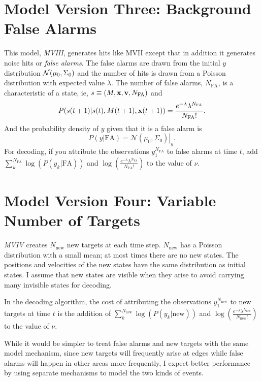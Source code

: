 \documentclass[12pt]{article}
\newcommand{\normal}[2]{{\cal N}(#1,#2)}
\newcommand{\NormalE}[3]{{\mathcal{N}}\left.\left(#1,#2\right)\right|_{#3}}
\newcommand{\ti}[2]{{#1}{(#2)}}                         %
\begin{document}
\section{Model Version Three: Background False Alarms}
\label{sec:model3}

This model, \emph{MVIII}, generates hits like MVII except that in
addition it generates noise hits or \emph{false alarms}.  The false
alarms are drawn from the initial $y$ distribution
$\normal{\mu_0}{\Sigma_0}$ and the number of hits is drawn from a
Poisson distribution with expected value $\lambda$.  The number of
false alarms, $N_{\text{FA}}$, is a characteristic of a state, ie, $s
\equiv (M,{\mathbf{x}},{\mathbf{v}},N_{\text{FA}})$ and
\begin{equation}
  \label{eq:2}
  P(\ti{s}{t+1}|\ti{s}{t},\ti{M}{t+1},\ti{\bx}{t+1}) =
  \frac{e^{-\lambda}\lambda^{N_{\text{FA}}}}{N_{\text{FA}}!}.
\end{equation}
And the probability density of $y$ given that it is a false alarm is
\begin{equation*}
  P(y|\text{FA}) = \NormalE{\mu_0}{\Sigma_0}{y}.
\end{equation*}
For decoding, if you attribute the observations $y_1^{N_{\text{FA}}}$
to false alarms at time $t$, add $\sum_k^{N_{\text{FA}}}
\log(P(y_k|\text{FA}))$ and $\log \left(
  \frac{e^{-\lambda}\lambda^{N_{\text{FA}}}}{N_{\text{FA}}!}\right)$ to
the value of $\nu$.


\section{Model Version Four: Variable Number of Targets}
\label{sec:model4}

\emph{MVIV} creates $N_{\text{new}}$ new targets at each time step.
$N_{\text{new}}$ has a Poisson distribution with a small mean; at most
times there are no new states.  The positions and velocities of the
new states have the same distribution as initial states.  I assume
that new states are visible when they arise to avoid carrying many
invisible states for decoding.

In the decoding algorithm, the cost of attributing the observations
$y_1^{N_{\text{new}}}$ to new targets at time $t$ is the addition of
$\sum_k^{N_{\text{new}}} \log(P(y_k|\text{new}))$ and $\log \left(
  \frac{e^{-\lambda}\lambda^{N_{\text{new}}}}{N_{\text{new}}!}\right)$
to the value of $\nu$.

While it would be simpler to treat false alarms and new targets with
the same model mechanism, since new targets will frequently arise at
edges while false alarms will happen in other areas more frequently, I
expect better performance by using separate mechanisms to model the
two kinds of events.
\end{document}
